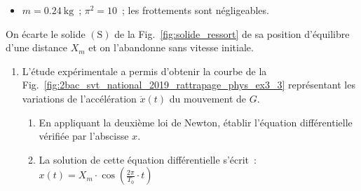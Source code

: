 \begin{donnees}
    \begin{itemize}
        \item $m=\qty{0,24}{\kg}$~; $\pi^{2}=10$~;
              les frottements sont négligeables.
    \end{itemize}
\end{donnees}

On écarte le solide $\mathrm{(S)}$ de la Fig.~\ref{fig:solide_ressort} de sa
position d’équilibre d’une distance $X_{m}$ et on l'abandonne sans vitesse
initiale.

\begin{enumerate}
    \item L'étude expérimentale a permis d'obtenir la courbe de la
          Fig.~\ref{fig:2bac_svt_national_2019_rattrapage_phys_ex3_3}
          représentant les variations de l'accélération $\ddot{x}(t)$ du
          mouvement de $G$.\par
          \begin{minipage}{0.68\linewidth}
              \begin{enumerate}
                  \item En appliquant la deuxième loi de Newton, établir
                        l'équation différentielle vérifiée par l'abscisse $x$.
                  \item La solution de cette équation différentielle s'écrit~:\\
                        $x(t)=X_{m}\cdot
                        \cos\left(\frac{2\pi}{T_{0}}\cdot t\right)$


\end{enumerate}
\end{minipage}
\end{enumerate}
